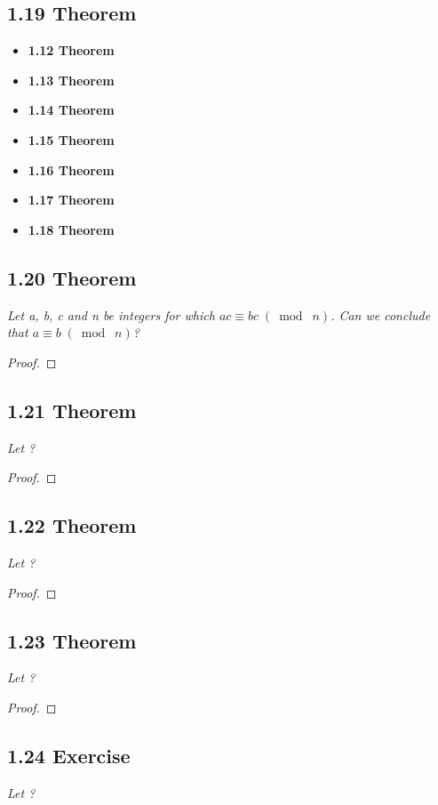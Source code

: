 \documentclass{article}
\begin{document}
\subsection*{1.19 Theorem}
\begin{itemize}
    \item \textbf{1.12 Theorem} 
    \item \textbf{1.13 Theorem} 
    \item \textbf{1.14 Theorem} 
    \item \textbf{1.15 Theorem} 
    \item \textbf{1.16 Theorem} 
    \item \textbf{1.17 Theorem} 
    \item \textbf{1.18 Theorem} 
\end{itemize}

\subsection*{1.20 Theorem} 
\quad \textit{Let a, b, c and n be integers for which $ac \equiv bc \;(\bmod\; n)$. Can we conclude that $a \equiv b \;(\bmod\; n)$?}

\begin{proof}
\end{proof}

\subsection*{1.21 Theorem} 
\quad \textit{Let ?}

\begin{proof}
\end{proof}

\subsection*{1.22 Theorem} 
\quad \textit{Let ?}

\begin{proof}
\end{proof}

\subsection*{1.23 Theorem} 
\quad \textit{Let ?}

\begin{proof}
\end{proof}

\subsection*{1.24 Exercise} 
\quad \textit{Let ?}
\end{document}
